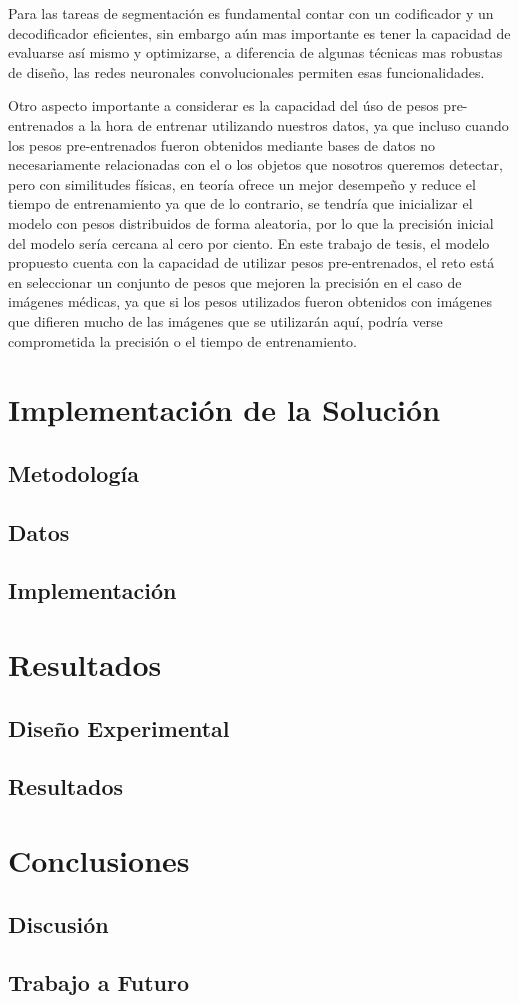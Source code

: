 Para las tareas de segmentación es fundamental contar con un codificador y un decodificador eficientes, sin embargo aún mas importante es tener la capacidad de evaluarse así mismo y optimizarse, a diferencia de algunas técnicas mas robustas de diseño, las redes neuronales convolucionales permiten esas funcionalidades.

Otro aspecto importante a considerar es la capacidad del úso de pesos pre-entrenados a la hora de entrenar utilizando nuestros datos, ya que incluso cuando los pesos pre-entrenados fueron obtenidos mediante bases de datos no necesariamente relacionadas con el o los objetos que nosotros queremos detectar, pero con similitudes físicas, en teoría ofrece un mejor desempeño y reduce el tiempo de entrenamiento ya que de lo contrario, se tendría que inicializar el modelo con pesos distribuidos de forma aleatoria, por lo que la precisión inicial del modelo sería cercana al cero por ciento. En este trabajo de tesis, el modelo propuesto cuenta con la capacidad de utilizar pesos pre-entrenados, el reto está en seleccionar un conjunto de pesos que mejoren la precisión en el caso de imágenes médicas, ya que si los pesos utilizados fueron obtenidos con imágenes que difieren mucho de las imágenes que se utilizarán aquí, podría verse comprometida la precisión o el tiempo de entrenamiento.

\chapter{Implementación de la Solución}

\section{Metodología}

\section{Datos}

\section{Implementación}

\chapter{Resultados}

\section{Diseño Experimental}

\section{Resultados}

\chapter{Conclusiones}

\section{Discusión}

\section{Trabajo a Futuro}